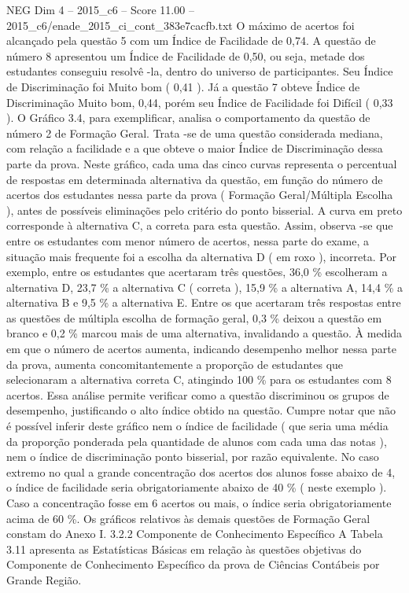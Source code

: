 \begin{textsample}{NEG Dim 4 – 2015\_c6 – Score 11.00 – 2015\_c6/enade\_2015\_ci\_cont\_383e7cacfb.txt}
O máximo de acertos foi alcançado pela questão 5 com um Índice de Facilidade de 0,74.
A questão de número 8 apresentou um Índice de Facilidade de 0,50, ou seja, metade dos estudantes conseguiu resolvê -la, dentro do universo de participantes.
Seu Índice de Discriminação foi Muito bom ( 0,41 ).
Já a questão 7 obteve Índice de Discriminação Muito bom, 0,44, porém seu Índice de Facilidade foi Difícil ( 0,33 ).
O Gráfico 3.4, para exemplificar, analisa o comportamento da questão de número 2 de Formação Geral.
Trata -se de uma questão considerada mediana, com relação a facilidade e a que obteve o maior Índice de Discriminação dessa parte da prova.
Neste gráfico, cada uma das cinco curvas representa o percentual de respostas em determinada alternativa da questão, em função do número de acertos dos estudantes nessa parte da prova ( Formação Geral/Múltipla Escolha ), antes de possíveis eliminações pelo critério do ponto bisserial.
A curva em preto corresponde à alternativa C, a correta para esta questão.
Assim, observa -se que entre os estudantes com menor número de acertos, nessa parte do exame, a situação mais frequente foi a escolha da alternativa D ( em roxo ), incorreta.
Por exemplo, entre os estudantes que acertaram três questões, 36,0 \% escolheram a alternativa D, 23,7 \% a alternativa C ( correta ), 15,9 \% a alternativa A, 14,4 \% a alternativa B e 9,5 \% a alternativa E.
Entre os que acertaram três respostas entre as questões de múltipla escolha de formação geral, 0,3 \% deixou a questão em branco e 0,2 \% marcou mais de uma alternativa, invalidando a questão.
À medida em que o número de acertos aumenta, indicando desempenho melhor nessa parte da prova, aumenta concomitantemente a proporção de estudantes que selecionaram a alternativa correta C, atingindo 100 \% para os estudantes com 8 acertos.
Essa análise permite verificar como a questão discriminou os grupos de desempenho, justificando o alto índice obtido na questão.
Cumpre notar que não é possível inferir deste gráfico nem o índice de facilidade ( que seria uma média da proporção ponderada pela quantidade de alunos com cada uma das notas ), nem o índice de discriminação ponto bisserial, por razão equivalente.
No caso extremo no qual a grande concentração dos acertos dos alunos fosse abaixo de 4, o índice de facilidade seria obrigatoriamente abaixo de 40 \% ( neste exemplo ).
Caso a concentração fosse em 6 acertos ou mais, o índice seria obrigatoriamente acima de 60 \%.
Os gráficos relativos às demais questões de Formação Geral constam do Anexo I. 3.2.2 Componente de Conhecimento Específico A Tabela 3.11 apresenta as Estatísticas Básicas em relação às questões objetivas do Componente de Conhecimento Específico da prova de Ciências Contábeis por Grande Região.

\end{textsample}
